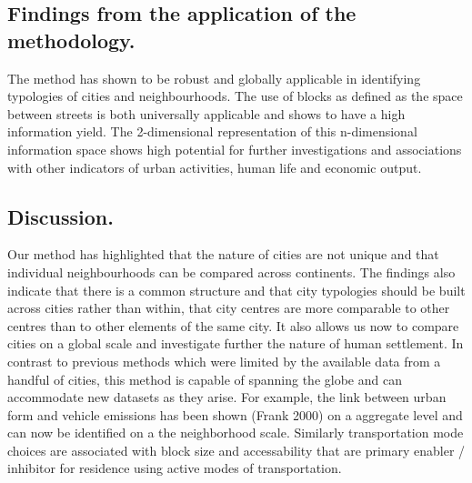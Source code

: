 \documentclass{nature}
\begin{document}
\subsection{Findings from the application of the methodology.}
The method has shown to be robust and globally applicable in identifying typologies of cities and neighbourhoods. The use of blocks as defined as the space between streets is both universally applicable and shows to have a high information yield. The 2-dimensional representation of this n-dimensional information space shows high potential for further investigations and associations with other indicators of urban activities, human life and economic output.

\subsection{Discussion.}
Our method has highlighted that the nature of cities are not unique and that individual neighbourhoods can be compared across continents. The findings also indicate that there is a common structure and that city typologies should be built across cities rather than within, that city centres are more comparable to other centres than to other elements of the same city. It also allows us now to compare cities on a global scale and investigate further the nature of human settlement. In contrast to previous methods which were limited by the available data from a handful of cities, this method is capable of spanning the globe and can accommodate new datasets as they arise. For example, the link between urban form and vehicle emissions has been shown (Frank 2000) on a aggregate level and can now be identified on a the neighborhood scale. Similarly transportation mode choices are associated with block size and accessability that are primary enabler / inhibitor for residence using active modes of transportation. 
\end{document}
